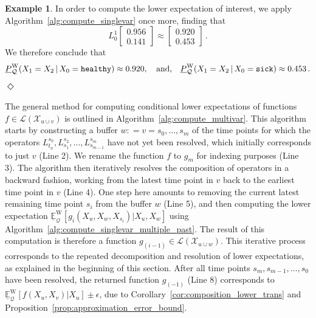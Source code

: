 \documentclass[10pt,a4paper]{paper}
\theoremstyle{definition}
\newtheorem{exmp}{Example}%
\newcommand{\states}{\mathcal{X}}
\newcommand{\gambles}{\mathcal{L}}
\newcommand{\rateset}{\mathcal{Q}}
\newcommand{\coloneqq}{:\!=}
\newcommand{\exampleend}{\hfill$\Diamond$}
\begin{document}
\begin{exmp}
In order to compute the lower expectation of interest, we apply Algorithm~\ref{alg:compute_singlevar} once more, finding that
\begin{equation*}
L_0^1\left[\begin{array}{c}
0.956 \\
0.141
\end{array}\right] \approx \left[\begin{array}{c}
0.920 \\
0.453
\end{array}\right]\,.
\end{equation*}
We therefore conclude that
\begin{align*}
\underline{P}_{\rateset}^{\mathrm{W}}(X_1 = X_2\,\vert\,X_0=\text{{\tt healthy}}) \approx 0.920,\quad\text{and,}\quad \underline{P}_{\rateset}^{\mathrm{W}}(X_1 = X_2\,\vert\,X_0=\text{{\tt sick}}) \approx 0.453\,.
\end{align*}
\exampleend
\end{exmp}

The general method for computing conditional lower expectations of functions $f\in\gambles(\states_{u\cup v})$ is outlined in Algorithm~\ref{alg:compute_multivar}. This algorithm starts by constructing a buffer $w\coloneqq v=s_0,\ldots,s_m$ of the time points for which the operators $L_{t_n}^{s_0},L_{s_1}^{s_2},\ldots,L_{s_{m-1}}^{s_m}$ have not yet been resolved, which initially corresponds to just $v$ (Line 2). We rename the function $f$ to $g_m$ for indexing purposes (Line 3). The algorithm then iteratively resolves the composition of operators in a backward fashion, working from the latest time point in $v$ back to the earliest time point in $v$ (Line 4). One step here amounts to removing the current latest remaining time point $s_i$ from the buffer $w$ (Line 5), and then computing the lower expectation $\underline{\mathbb{E}}_{\rateset}^\mathrm{W}[g_i(X_u,X_w,X_{s_i})\vert X_u,X_w]$ using Algorithm~\ref{alg:compute_singlevar_multiple_past}. The result of this computation is therefore a function $g_{(i-1)}\in\gambles(\states_{u\cup w})$. This iterative process corresponds to the repeated decomposition and resolution of lower expectations, as explained in the beginning of this section. After all time points $s_m,s_{m-1},\ldots,s_0$ have been resolved, the returned function $g_{(-1)}$ (Line 8) corresponds to $\underline{\mathbb{E}}_{\rateset}^\mathrm{W}[f(X_u,X_v)\vert X_u]\pm\epsilon$, due to Corollary~\ref{cor:composition_lower_trans} and Proposition~\ref{prop:approximation_error_bound}.
\end{document}
